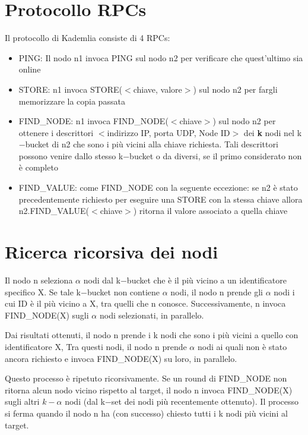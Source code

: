\section{Protocollo RPCs}
Il protocollo di Kademlia consiste di 4 RPCs:
\begin{itemize}
    \item PING: Il nodo n1 invoca PING sul nodo n2 per verificare che quest'ultimo sia online
    \item STORE: n1 invoca STORE($<$chiave, valore$>$) sul nodo n2 per fargli memorizzare la copia passata
    \item FIND\_NODE: n1 invoca FIND\_NODE($<$chiave$>$) sul nodo n2 per ottenere i descrittori $<$indirizzo IP, porta UDP, Node ID$>$ dei \textbf{k} nodi nel k$-$bucket di n2 che sono i più vicini alla chiave richiesta. Tali descrittori possono venire dallo stesso k$-$bucket o da diversi, se il primo considerato non è completo
    \item FIND\_VALUE: come FIND\_NODE con la seguente eccezione: se n2 è stato precedentemente richiesto per eseguire una STORE con la stessa chiave allora n2.FIND\_VALUE($<$chiave$>$) ritorna il valore associato a quella chiave
\end{itemize}


\section{Ricerca ricorsiva dei nodi}
Il nodo n seleziona $\alpha$ nodi dal k$-$bucket che è il più vicino a un identificatore specifico X. Se tale k$-$bucket non contiene $\alpha$ nodi, il nodo n prende gli $\alpha$ nodi i cui ID è il più vicino a X, tra quelli che n conosce. Successivamente, n invoca FIND\_NODE(X) sugli $\alpha$ nodi selezionati, in parallelo. 

Dai risultati ottenuti, il nodo n prende i k nodi che sono i più vicini a quello con identificatore X, Tra questi nodi, il nodo n prende $\alpha$ nodi ai quali non è stato ancora richiesto e invoca FIND\_NODE(X) su loro, in parallelo. 

Questo processo è ripetuto ricorsivamente. Se un round di FIND\_NODE non ritorna alcun nodo vicino rispetto al target, il nodo n invoca FIND\_NODE(X) sugli altri $k-\alpha$ nodi (dal k$-$set dei nodi più recentemente ottenuto). Il processo si ferma quando il nodo n ha (con successo) chiesto tutti i k nodi più vicini al target.

